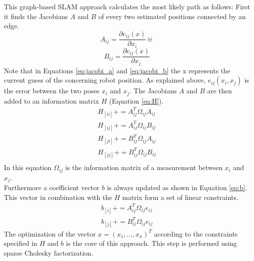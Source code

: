 \documentclass{ba-kecs}
\begin{document}
This graph-based SLAM approach calculates the most likely path as follows:
First it finds the Jacobians \(A\) and \(B\) of every two estimated positions connected by an edge.
\begin{equation}
\label{eq:jacobi_a}
	A_{ij} = \frac{\partial e_{ij}(x)}{\partial x_i}\uplus
\end{equation}
\begin{equation}
\label{eq:jacobi_b}
	B_{ij} = \frac{\partial e_{ij}(x)}{\partial x_j}
\end{equation}
Note that in Equations \ref{eq:jacobi_a} and \ref{eq:jacobi_b} the x represents the current guess of the concerning robot position. As explained above, \(e_{ij}(x_i, x_j)\) is the error between the two poses \(x_i\) and \(x_j\). The Jacobians \(A\) and \(B\) are then added to an information matrix \(H\) (Equation \ref{eq:H}).
\begin{equation}
\label{eq:H}
\begin{aligned}
	H_{[ii]} += A^{T}_{ij} \Omega_{ij} A_{ij} \\
	H_{[ij]} += A^{T}_{ij} \Omega_{ij} B_{ij} \\
	H_{[ji]} += B^{T}_{ij} \Omega_{ij} A_{ij} \\
	H_{[jj]} += B^{T}_{ij} \Omega_{ij} B_{ij} \\
\end{aligned}
\end{equation}
In this equation $\Omega_{ij}$ is the information matrix of a measurement between \(x_i\) and \(x_j\).
\\
Furthermore a coefficient vector \(b\) is always updated as shown in Equation \ref{eq:b}. This vector in combination with the \(H\) matrix form a set of linear constraints.
\begin{equation}
\label{eq:b}
\begin{aligned}
	b_{[i]} += A^{T}_{ij} \Omega_{ij} e_{ij} \\
	b_{[j]} += B^{T}_{ij} \Omega_{ij} e_{ij} 
\end{aligned}
\end{equation}
The optimization of the vector \(x = (x_1, ..., x_n)^T \) according to the constraints specified in \(H\) and \(b\) is the core of this approach. This step is performed using sparse Cholesky factorization. 
\end{document}

